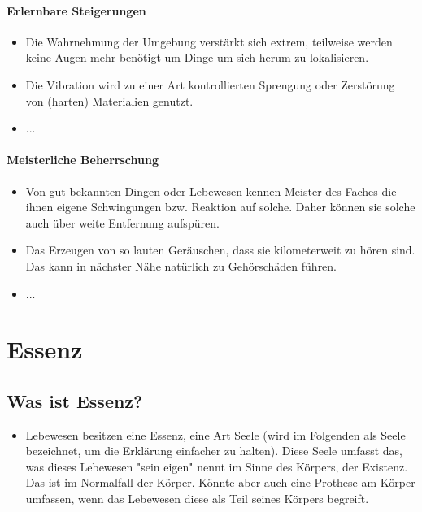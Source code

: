 \subsubsection{Erlernbare Steigerungen}
\begin{itemize}
	\item Die Wahrnehmung der Umgebung verstärkt sich extrem, teilweise werden keine Augen mehr benötigt um Dinge um sich herum zu lokalisieren. 
	\item Die Vibration wird zu einer Art kontrollierten Sprengung oder Zerstörung von (harten) Materialien genutzt.
	\item ...
\end{itemize}

\subsubsection{Meisterliche Beherrschung} 
\begin{itemize}
	\item Von gut bekannten Dingen oder Lebewesen kennen Meister des Faches die ihnen eigene Schwingungen bzw. Reaktion auf solche. Daher können sie solche auch über weite Entfernung aufspüren.
	\item Das Erzeugen von so lauten Geräuschen, dass sie kilometerweit zu hören sind. Das kann in nächster Nähe natürlich zu Gehörschäden führen.
	\item ...
\end{itemize}







\chapter{Essenz}
\section{Was ist Essenz?}
\begin{itemize}
	\item Lebewesen besitzen eine Essenz, eine Art Seele (wird im Folgenden als Seele bezeichnet, um die Erklärung einfacher zu halten). Diese Seele umfasst das, was dieses Lebewesen "sein eigen" nennt im Sinne des Körpers, der Existenz. Das ist im Normalfall der Körper. Könnte aber auch eine Prothese am Körper umfassen, wenn das Lebewesen diese als Teil seines Körpers begreift.
\end{itemize}